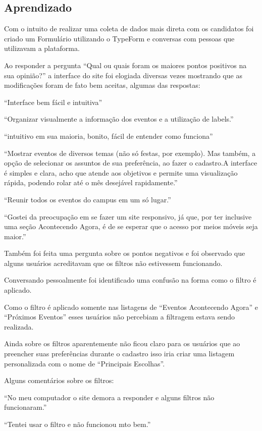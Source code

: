 \subsection{Aprendizado}
\par Com o intuito de realizar uma coleta de dados mais direta com os candidatos foi criado um Formulário utilizando o TypeForm e conversas com pessoas que utilizavam a plataforma.
\par Ao responder a pergunta ``Qual ou quais foram os maiores pontos positivos na sua opinião?'' a interface do site foi elogiada diversas vezes mostrando que as modificações foram de fato bem aceitas, algumas das respostas:
\par ``Interface bem fácil e intuitiva''\\
\par ``Organizar visualmente a informação dos eventos e a utilização de labels.''\\
\par ``intuitivo em sua maioria, bonito, fácil de entender como funciona''\\
\par ``Mostrar eventos de diversos temas (não só festas, por exemplo). Mas também, a
opção de selecionar os assuntos de sua preferência, ao fazer o cadastro.A interface é simples e clara, acho que atende aos objetivos e permite uma visualização rápida, podendo rolar até o mês desejável rapidamente.''\\
\par ``Reunir todos os eventos do campus em um só lugar.''\\
\par ``Gostei da preocupação em se fazer um site responsivo, já que, por ter inclusive uma seção Acontecendo Agora, é de se esperar que o acesso por meios móveis seja maior.''\\

\par Também foi feita uma pergunta sobre os pontos negativos e foi observado que alguns usuários acreditavam que os filtros não estivessem funcionando.
\par Conversando pessoalmente foi identificado uma confusão na forma como o filtro é aplicado.
\par Como o filtro é aplicado somente nas listagens de ``Eventos Acontecendo Agora'' e ``Próximos Eventos'' esses usuários não percebiam a filtragem estava sendo realizada.
\par Ainda sobre os filtros aparentemente não ficou claro para os usuários que ao preencher suas preferências durante o cadastro isso iria criar uma listagem personalizada com o nome de ``Principais Escolhas''.
\par Alguns comentários sobre os filtros:
\par ``No meu computador o site demora a responder e alguns filtros não funcionaram.''\\
\par ``Tentei usar o filtro e não funcionou mto bem.''\\

